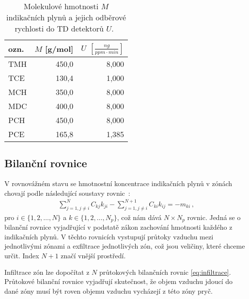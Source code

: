 \begin{table}[ht]
    \centering
    \caption{Molekulové hmotnosti $M$ indikačních plynů a jejich odběrové rychlosti do TD detektorů $U$.~\cite{metodika}}
    \label{tab:prutoky_plyny_konstanty}
    \begin{tabular}{lrr}
        \toprule
ozn. & $M$ [g/mol] & $U$ $\left[\si{\frac{ng}{ppm\cdot min}}\right]$\\
\midrule
TMH & 450,0 &  8,000 \\
TCE & 130,4 &  1,000 \\
MCH & 350,0 &  8,000 \\
MDC & 400,0 &  8,000 \\
PCH & 450,0 &  8,000 \\
PCE & 165,8 &  1,385 \\
\bottomrule
    \end{tabular}
\end{table}

\subsection{Bilanční rovnice}
V rovnovážném stavu se hmotnostní koncentrace indikačních plynů v zónách chovají podle následující soustavy rovnic~\cite{japonci}:
\begin{align}
    \sum_{j=1,j\neq i}^{N}C_{kj}k_{ji}-\sum_{j=1,j\neq i}^{N+1}C_{ki}k_{ij}=-m_{ki}\,,
    \label{eq:prutoky_rovnice}
\end{align}
pro $i\in\{1,2, \ldots, N\}$ a $k\in\{1,2,\ldots, N_p\}$, což nám dává $N\times N_p$ rovnic. Jedná se o bilanční rovnice vyjadřující v podstatě zákon zachování hmotnosti každého z indikačních plynů. V těchto rovnicích vystupují průtoky vzduchu mezi jednotlivými zónami a exfiltrace jednotlivých zón, což jsou veličiny, které chceme určit. Index $N+1$ značí vnější prostředí.

Infiltrace zón lze dopočítat z $N$ průtokových bilančních rovnic \eqref{eq:infiltrace}. Průtokové bilanční rovnice vyjadřují skutečnost, že objem vzduchu jdoucí do dané zóny musí být roven objemu vzduchu vycházejí z této zóny pryč. 

